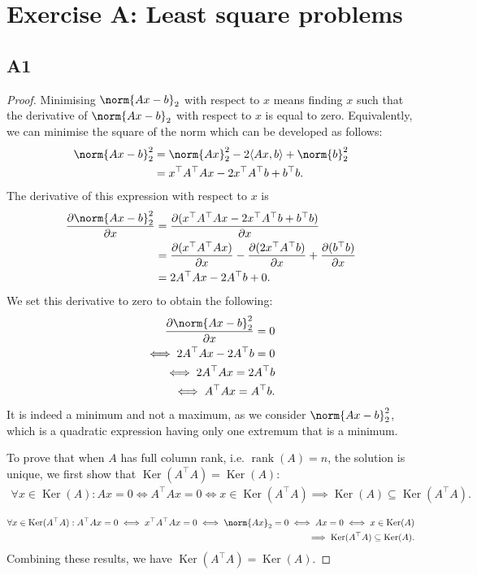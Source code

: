 \documentclass[11pt]{article}
\DeclareMathOperator{\rank}{rank}
\DeclareMathOperator{\Ker}{Ker}
\newcommand{\snorm}[1]{\norm{#1}_2} %
\begin{document}
\section*{Exercise A: Least square problems}
\subsection*{A1}
\begin{proof}
	Minimising $\snorm{Ax - b}$ with respect to \(x\) means finding \(x\) such that the derivative of $\snorm{Ax - b}$ with respect to \(x\) is equal to zero.
	Equivalently, we can minimise the square of the norm which can be developed as follows:
	\begin{align*}
	\snorm{Ax - b}^2 &= \snorm{Ax}^2 - 2 \langle Ax,b \rangle + \snorm{b}^2 \\
	&= x^\top A^\top Ax - 2x^\top A^\top b + b^\top b. 
	\end{align*}
	The derivative of this expression with respect to \(x\) is
	\begin{align*}
	\frac{\partial \snorm{Ax - b}^2}{\partial x} &= \frac{\partial(x^\top A^\top Ax - 2x^\top A^\top b + b^\top b)}{\partial x} \\
	&= \frac{\partial(x^\top A^\top Ax)}{\partial x} - \frac{\partial(2x^\top A^\top b)}{\partial x} + \frac{\partial(b^\top b)}{\partial x} \\
	&= 2A^\top Ax - 2A^\top b + 0.
	\end{align*}
	We set this derivative to zero to obtain the following:
	\begin{align*}
	\frac{\partial \snorm{Ax - b}^2}{\partial x} = 0\\
	\iff 2A^\top Ax - 2A^\top b = 0 \\
	\iff 2A^\top Ax = 2A^\top b \\
	\iff A^\top Ax = A^\top b.
	\end{align*}
	It is indeed a minimum and not a maximum, as we consider $\snorm{Ax-b}^2$, which is a quadratic expression having only one extremum that is a minimum.
	
	To prove that when \(A\) has full column rank, i.e. \(\rank(A)=n\), the solution is unique, we first show that \(\Ker(A^\top A) = \Ker(A)\):
	\begin{align*}
	\forall x \in \Ker(A): Ax = 0 \iff A^\top Ax = 0 \iff x \in \Ker(A^\top A) \implies \Ker(A) \subseteq \Ker(A^\top A).
	\end{align*}
	
	\begin{align*}
	\forall x \in \Ker(A^\top A): A^\top Ax = 0 \iff x^\top A^\top Ax = 0 \iff \snorm{Ax} = 0 \iff Ax = 0 \iff x \in \Ker(A) \\
	\implies \Ker(A^\top A) \subseteq \Ker(A).
	\end{align*}
	Combining these results, we have \(\Ker(A^\top A) = \Ker(A)\).
	

\end{proof}
\end{document}
